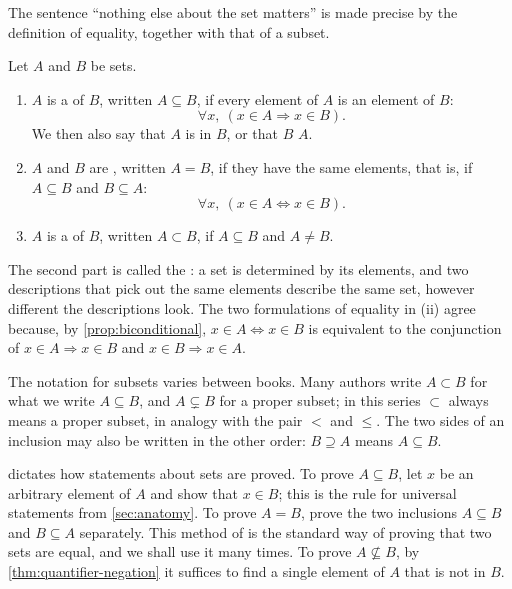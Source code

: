 The sentence ``nothing else about the set matters'' is made precise by the definition of equality, together with that of a subset.

\begin{definition}
\label{def:subset}
Let $A$ and $B$ be sets.
\begin{enumerate}
\item $A$ is a  of $B$, written $A\subseteq B$, if every element of $A$ is an element of $B$:
\[
\forall x,\ (x\in A\Rightarrow x\in B).
\]
We then also say that $A$ is  in $B$, or that $B$  $A$.
\item $A$ and $B$ are , written $A=B$, if they have the same elements, that is, if $A\subseteq B$ and $B\subseteq A$:
\[
\forall x,\ (x\in A\Leftrightarrow x\in B).
\]
\item $A$ is a  of $B$, written $A\subset B$, if $A\subseteq B$ and $A\ne B$.
\end{enumerate}
\end{definition}

The second part is called the : a set is determined by its elements, and two descriptions that pick out the same elements describe the same set, however different the descriptions look. The two formulations of equality in (ii) agree because, by \cref{prop:biconditional}, $x\in A\Leftrightarrow x\in B$ is equivalent to the conjunction of $x\in A\Rightarrow x\in B$ and $x\in B\Rightarrow x\in A$.

The notation for subsets varies between books. Many authors write $A\subset B$ for what we write $A\subseteq B$, and $A\subsetneq B$ for a proper subset; in this series $\subset$ always means a proper subset, in analogy with the pair $<$ and $\le$. The two sides of an inclusion may also be written in the other order: $B\supseteq A$ means $A\subseteq B$.

 dictates how statements about sets are proved. To prove $A\subseteq B$, let $x$ be an arbitrary element of $A$ and show that $x\in B$; this is the rule for universal statements from \cref{sec:anatomy}. To prove $A=B$, prove the two inclusions $A\subseteq B$ and $B\subseteq A$ separately. This method of  is the standard way of proving that two sets are equal, and we shall use it many times. To prove $A\not\subseteq B$, by \cref{thm:quantifier-negation} it suffices to find a single element of $A$ that is not in $B$.


